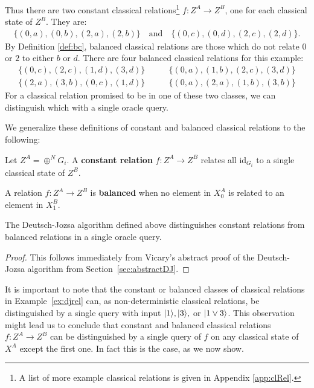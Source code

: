 \begin{example}
Thus there are two constant classical relations\footnote{A list of more example classical relations is given in Appendix \ref{app:clRel}.} $f:Z^A\to Z^B$, one for each classical state of $Z^B$. They are:
\begin{align*}
\{ (0,a),(0,b) ,(2,a),(2,b) \} \quad \mbox{and} \quad
\{ (0,c),(0,d), (2,c),(2,d) \}.
\end{align*}
By Definition \ref{def:bc}, balanced classical relations are those which do not relate $0$ or $2$ to either $b$ or $d$. There are four balanced classical relations for this example:
\begin{align*}
\{(0,c),(2,c),(1,d),(3,d)\} &\qquad \{(0,a),(1,b),(2,c),(3,d)\} \\
\{(2,a),(3,b),(0,c),(1,d)\} &\qquad \{(0,a),(2,a),(1,b),(3,b)\} 
\end{align*}
For a classical relation promised to be in one of these two classes, we can distinguish which with a single oracle query.
\end{example}

We generalize these definitions of constant and balanced classical relations to the following:
\begin{defn}
\label{def:const}
Let $Z^A=\oplus^NG_i$. A \textbf{constant relation} $f:Z^{A}\to Z^{B}$ relates all id$_{G_i}$ to a single classical state of $Z^B$.
\end{defn}

\begin{defn}
\label{def:balanced}
A relation $f:Z^{A}\to Z^{B}$ is \textbf{balanced} when no element in $X^{A}_0$ is related to an element in $X^{B}_1$.
\end{defn}

\begin{theorem}
\label{thm:dj_speedup}
The Deutsch-Jozsa algorithm defined above distinguishes constant relations from balanced relations in a single oracle query.
\end{theorem}
\begin{proof}
This follows immediately from Vicary's abstract proof of the Deutsch-Jozsa algorithm from Section~\ref{sec:abstractDJ}.
\end{proof}

\begin{remark}
It is important to note that the constant or balanced classes of classical relations in Example~\ref{ex:djrel} can, as non-deterministic classical relations, be distinguished by a single query with input $| 1 \rangle,| 3 \rangle,$ or $| 1\vee 3 \rangle$.  This observation might lead us to conclude that constant and balanced classical relations $f:Z^A\to Z^B$ can be distinguished by a single query of $f$ on any classical state of $X^A$ except the first one. In fact this is the case, as we now show.
\end{remark}

